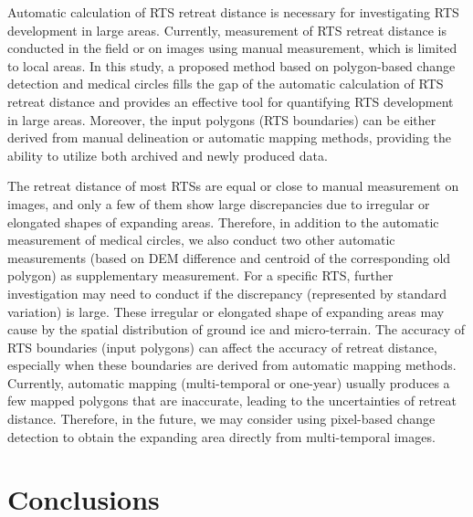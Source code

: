 \documentclass[authoryear,preprint,review,12pt]{elsarticle}
\begin{document}
Automatic calculation of RTS retreat distance is necessary for investigating RTS development in large areas.
Currently, measurement of RTS retreat distance is conducted in the field or on images using manual measurement, which is limited to local areas. 
In this study, a proposed method based on polygon-based change detection and medical circles fills the gap of the automatic calculation of RTS retreat distance 
and provides an effective tool for quantifying RTS development in large areas. 
Moreover, the input polygons (RTS boundaries) can be either derived from manual delineation or automatic mapping methods, 
providing the ability to utilize both archived and newly produced data.


The retreat distance of most RTSs are equal or close to manual measurement on images, and only a few of them show large discrepancies due to irregular or elongated shapes of expanding areas. 
Therefore, in addition to the automatic measurement of medical circles, we also conduct two other automatic measurements (based on DEM difference and centroid of the corresponding old polygon) as supplementary measurement. 
For a specific RTS, further investigation may need to conduct if the discrepancy (represented by standard variation) is large. 
These irregular or elongated shape of expanding areas may cause by the spatial distribution of ground ice and micro-terrain.
The accuracy of RTS boundaries (input polygons) can affect the accuracy of retreat distance, especially when these boundaries are derived from automatic mapping methods. 
Currently, automatic mapping (multi-temporal or one-year) usually produces a few mapped polygons that are inaccurate, leading to the uncertainties of retreat distance. 
Therefore, in the future, we may consider using pixel-based change detection to obtain the expanding area directly from multi-temporal images. 



%


\section{Conclusions}
\label{sec_conclusion}
\end{document}
